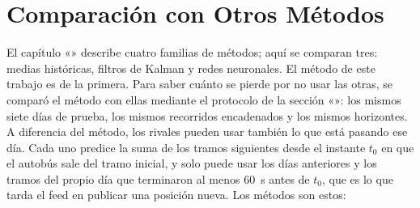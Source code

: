 \section{Comparación con Otros Métodos}
\label{sec:comparacion}

El capítulo «» describe cuatro familias de métodos; aquí se comparan tres: medias históricas, filtros de
Kalman y redes neuronales. El método de este trabajo es de la primera. Para saber cuánto se pierde por no usar las otras, se comparó
el método con ellas mediante el protocolo de la sección «»: los mismos siete días de
prueba, los mismos recorridos encadenados y los mismos horizontes. A diferencia del método, los rivales pueden usar
también lo que está pasando ese día. Cada uno predice la suma de los tramos siguientes desde el instante $t_0$ en que el
autobús sale del tramo inicial, y solo puede usar los días anteriores y los tramos del propio día que terminaron al
menos 60~s antes de $t_0$, que es lo que tarda el feed en publicar una posición nueva. Los métodos son estos:


